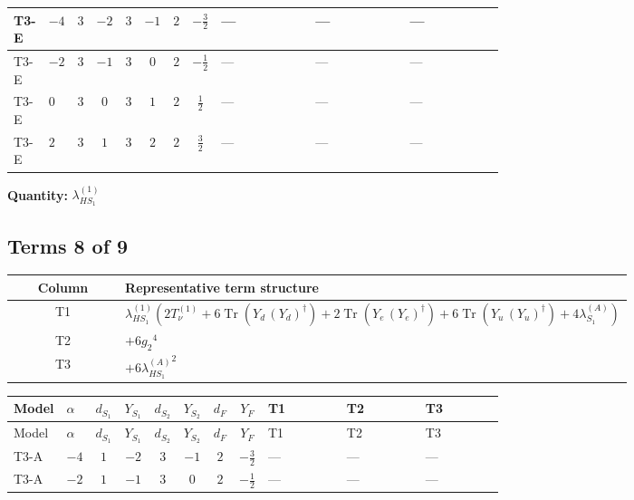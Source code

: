 \documentclass[8pt]{article}
\begin{document}
\begin{landscape}
\begin{longtable}{@{}llcccccc >{\raggedright\arraybackslash}p{0.21\linewidth} >{\raggedright\arraybackslash}p{0.21\linewidth} >{\raggedright\arraybackslash}p{0.21\linewidth}@{}}
\midrule
T3-E & $-4$ & $3$ & $-2$ & $3$ & $-1$ & $2$ & $-\frac{3}{2}$ & --- & --- & --- \\
\midrule
T3-E & $-2$ & $3$ & $-1$ & $3$ & $0$ & $2$ & $-\frac{1}{2}$ & --- & --- & --- \\
\midrule
T3-E & $0$ & $3$ & $0$ & $3$ & $1$ & $2$ & $\frac{1}{2}$ & --- & --- & --- \\
\midrule
T3-E & $2$ & $3$ & $1$ & $3$ & $2$ & $2$ & $\frac{3}{2}$ & --- & --- & --- \\
\midrule
\bottomrule
\end{longtable}
\clearpage
\noindent\textbf{Quantity: }$\lambda_{HS_1}^{(1)}$\par\smallskip
\subsection*{Terms 8 of 9}
\begin{center}
\begin{tabular}{@{}c >{\raggedright\arraybackslash}p{0.82\linewidth}@{}}
\toprule
Column & Representative term structure \\
\midrule
T1 & \(\displaystyle {\lambda_{HS_1}^{(1)}} (2 T_{\nu}^{(1)}+6 \operatorname{Tr}\!\left({Y_d}\,\left({Y_d}\right)^{\dagger}\right)+2 \operatorname{Tr}\!\left({Y_e}\,\left({Y_e}\right)^{\dagger}\right)+6 \operatorname{Tr}\!\left({Y_u}\,\left({Y_u}\right)^{\dagger}\right)+4 {\lambda_{S_1}^{(A)}})\) \\
\midrule
T2 & \(\displaystyle +6 {g_2}^4\) \\
\midrule
T3 & \(\displaystyle +6 {\lambda_{HS_1}^{(A)}}^2\) \\
\midrule
\bottomrule
\end{tabular}
\end{center}
\smallskip
\tiny
\begin{longtable}{@{}llcccccc >{\raggedright\arraybackslash}p{0.21\linewidth} >{\raggedright\arraybackslash}p{0.21\linewidth} >{\raggedright\arraybackslash}p{0.21\linewidth}@{}}
\toprule
Model & $\alpha$ & $d_{S_1}$ & $Y_{S_1}$ & $d_{S_2}$ & $Y_{S_2}$ & $d_F$ & $Y_F$ & T1 & T2 & T3 \\
\midrule
\endfirsthead
\toprule
Model & $\alpha$ & $d_{S_1}$ & $Y_{S_1}$ & $d_{S_2}$ & $Y_{S_2}$ & $d_F$ & $Y_F$ & T1 & T2 & T3 \\
\midrule
\endhead
T3-A & $-4$ & $1$ & $-2$ & $3$ & $-1$ & $2$ & $-\frac{3}{2}$ & --- & --- & --- \\
\midrule
T3-A & $-2$ & $1$ & $-1$ & $3$ & $0$ & $2$ & $-\frac{1}{2}$ & --- & --- & --- \\

\end{longtable}
\end{landscape}
\end{document}
